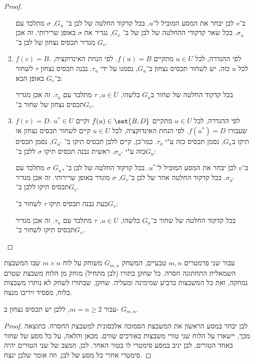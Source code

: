 \documentclass[a4paper,10pt,twoside,openany]{book}
\begin{document}
\begin{proof}
\begin{enumerate}
ב־$v$ לבן יבחר את המסע המוביל ל־$u$. בכל קדקוד החלטה של לבן ב־ $G_u$, 
$\sigma$ 
מתלכד עם 
$\sigma_u$.
בכל שאר קדקודי ההחלטה של לבן של ב־
$G_v$,
נגדיר את $\sigma$ באופן שרירותי. זה אכן מגדיר תכסיס נצחון של לבן ב־
$G_v$.
\item $f(v) = B$. 
לפי ההגדרה, לכל $u \in U$ מתקיים $f(u) = B$. לפי הנחת האינדוקציה, לכל $u$ כזה, יש לשחור תכסיס נצחון ב־$G_u$, נסמנו על ידי 
$\tau_u$.
נבנה תכסיס נצחון $\tau$ לשחור ב־$G_v$ באופן הבא:


בכל קדקוד החלטה של שחור ב$G_u$ כלשהו,
$u \in U$,
$\tau$ 
מתלכד עם
$\tau_u$.
זה אכן מגדיר תכסיס נצחון של שחור ב־$G_v$.
\item $f(v) = D$. 
לפי ההגדרה, לכל $u \in U$ מתקיים 
$f(u) \in \set{B, D}$
וקיים 
$u^{*} \in U$ 
שעבורו
$f(u^*) = D$.
לפי הנחת האינדוקציה, לכל $u \in U$ קיים לשחור תכסיס נצחון או תיקו ב$G_u$, 
נסמן תכסיס כזה ע"י 
$\tau_u$.
כמו־כן, קיים ללבן תכסיס תיקו ב־
$G_{u^*}$,
נסמן תכסיס כזה ע"י
$\sigma_{u^*}$.
ראשית נבנה תכסיס תיקו $\sigma$ 
ללבן ב־$G_{u}$:


ב־$v$ לבן יבחר את המסע המוביל ל־$u^*$. בכל קדקוד החלטה של לבן ב־$G_{u*}$ 
$\sigma$ 
מתלכד עם
$\sigma_{u^*}$.
בכל קדקוד החלטה אחר של לבן ב־$G_v$, $\sigma$ מוגדר באופן שרירותי.
זה אכן מגדיר תכסיס תיקו ללבן ב־$G_v$.

כעת נבנה תכסיס תיקו $\tau$ לשחור ב־$G_v$:

בכל קדקוד החלטה של שחור ב־$G_u$ כלשהו, $u \in U$, 
$\tau$ 
מתלכד עם $\tau_u$.
זה אכן מגדיר תכסיס תיקו לשחור ב־$G_v$.
\end{enumerate}
\end{proof}

\begin{example}
עבור שני פרמטרים $m, n$ טבעיים, המשחק
$G_{m, n}$
משוחק על לוח $m \times n$
שבו המשבצת השמאלית התחתונה חסרה.
כל שחקן בתורו (לבן מתחיל) מוחק מן הלוח משבצת שטרם נמחקה, ואת כל המשבצות ברביע שמימינה 
ומעליה. שחקן, שבתורו לשחק לא נותרו משבצות בלוח, מפסיד ויריבו מנצח.
\begin{claim}
עבור 
$m = n \geq 2$,
ללבן יש תכסיס נצחון ב-
$G_{m, n}$.
\end{claim}
\begin{proof}
לבן יבחר במסע הראשון את המשבצת הסמוכה אלכסונית למשבצת החסרה. כתוצאה מכך, יישארו על הלוח שני טורי משבצות באורכים שווים. מכאן והלאה, על כל מסע של שחור באחד הטורים, לבן יגיב במסע סימטרי לו בטור האחר. לכן, המצב של שני הטורים יהיה סימטרי אחרי כל מסע של לבן, וזה אומר שלבן ינצח.
\end{proof}
\end{example}
\backmatter
\end{document}
